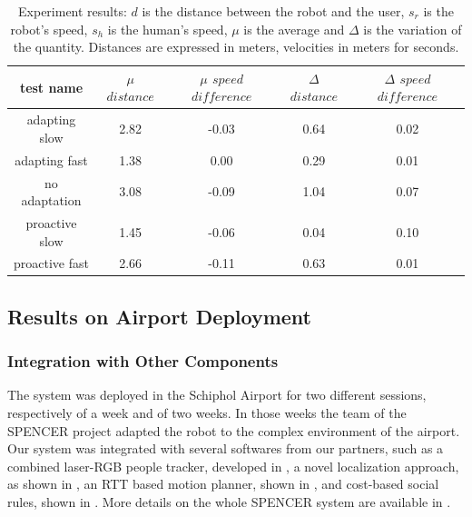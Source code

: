 \begin{table}
\caption{Experiment results: $d$ is the distance between the robot and the user, $s_r$ is the robot's speed, $s_h$ is the human's speed, $\mu$ is the average and $\Delta$ is the variation of the quantity. Distances are expressed in meters, velocities in meters for seconds.}
\centering
\begin{tabular}{ | c | c | c | c | c | }

\hline
  test name     & $\mu$ $distance$ & $\mu$ $speed$ $difference$ & $\Delta$ $distance$ & $\Delta$ $speed$ $difference$ \\
\hline
adapting slow & 2.82 & -0.03 & 0.64 & 0.02 \\
  \hline
  adapting fast & 1.38 & 0.00 & 0.29 & 0.01 \\
  \hline
  no adaptation & 3.08 & -0.09 & 1.04 & 0.07 \\
\hline
proactive slow & 1.45 & -0.06 & 0.04 & 0.10 \\
\hline
proactive fast & 2.66 & -0.11 & 0.63 & 0.01 \\
\hline
\end{tabular}
\label{table:case-study-spencer-experiment_results}
\end{table}


\subsection{Results on Airport Deployment}
\label{subsec:case_study-spencer-airport}
\subsubsection{Integration with Other Components}
The system was deployed in the Schiphol Airport for two different sessions, respectively of a week and of two weeks. In those weeks the team of the SPENCER project adapted the robot to the complex environment of the airport. Our system was integrated with several softwares from our partners, such as a combined laser-RGB people tracker, developed in \cite{lindermulti}, a novel localization approach, as shown in \cite{kucner2015ndt}, an RTT based motion planner, shown in \cite{palmierirrt}, and cost-based social rules, shown in \cite{okallearning}. More details on the whole SPENCER system are available in \cite{triebel2015spencer}.


